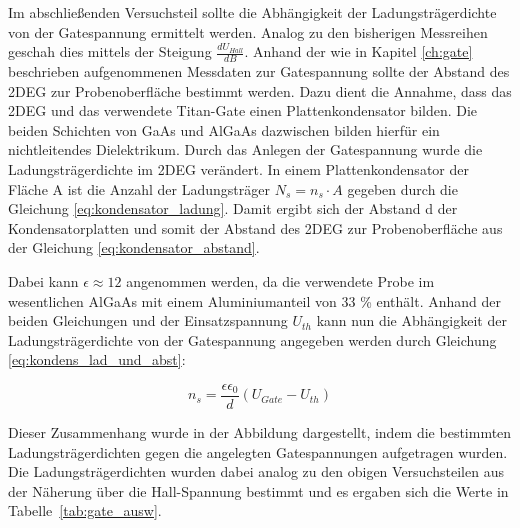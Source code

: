 
Im abschließenden Versuchsteil sollte die Abhängigkeit der Ladungsträgerdichte von der Gatespannung ermittelt werden.
Analog zu den bisherigen Messreihen geschah dies mittels der Steigung $\frac{dU_{Hall}}{dB}$. 
Anhand der wie in Kapitel \ref{ch:gate} beschrieben aufgenommenen Messdaten zur Gatespannung sollte der Abstand des 2DEG zur Probenoberfläche bestimmt werden. Dazu dient die Annahme, dass das 2DEG und das verwendete Titan-Gate einen Plattenkondensator bilden. Die beiden Schichten von GaAs und AlGaAs dazwischen bilden hierfür ein nichtleitendes Dielektrikum. 
Durch das Anlegen der Gatespannung wurde die Ladungsträgerdichte im 2DEG verändert. 
In einem Plattenkondensator der Fläche A ist die Anzahl der Ladungsträger $N_s=n_s \cdot A$ gegeben durch die Gleichung \ref{eq:kondensator_ladung}. 
Damit ergibt sich der Abstand d der Kondensatorplatten und somit der Abstand des 2DEG zur Probenoberfläche aus der Gleichung \ref{eq:kondensator_abstand}. 

Dabei kann $\epsilon \approx 12$ angenommen werden, da die verwendete Probe im wesentlichen AlGaAs mit einem Aluminiumanteil von 33 \% enthält.
Anhand der beiden Gleichungen und der Einsatzspannung $U_{th}$ kann nun die Abhängigkeit der Ladungsträgerdichte von der Gatespannung angegeben werden durch Gleichung \ref{eq:kondens_lad_und_abst}:

\begin{equation}
n_s=\frac{\epsilon \epsilon_0}{d}(U_{Gate}-U_{th})
\end{equation}

Dieser Zusammenhang wurde in der Abbildung %
dargestellt, indem die bestimmten Ladungsträgerdichten gegen die angelegten Gatespannungen aufgetragen wurden. 
Die Ladungsträgerdichten wurden dabei analog zu den obigen Versuchsteilen aus der Näherung über die Hall-Spannung bestimmt und es ergaben sich die Werte in Tabelle~\ref{tab:gate_ausw}. %

